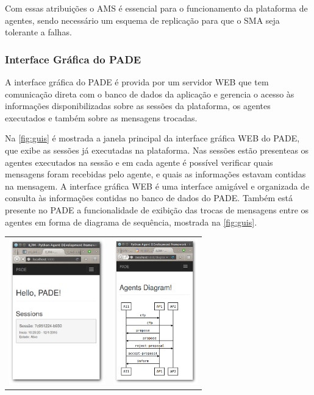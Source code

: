 \documentclass[journal]{IEEEtran}
\begin{document}
Com essas atribuições o AMS é essencial para o funcionamento da plataforma de agentes, sendo necessário um esquema de replicação para que o SMA seja tolerante a falhas.

\subsubsection{Interface Gráfica do PADE}

A interface gráfica do PADE é provida por um servidor WEB que tem comunicação direta com o banco de dados da aplicação e gerencia o acesso às informações disponibilizadas sobre as sessões da plataforma, os agentes executados e também sobre as mensagens trocadas.

Na  \autoref{fig:guis} é mostrada a janela principal da interface gráfica WEB do PADE, que exibe as sessões já executadas na plataforma. Nas sessões estão presenteas os agentes executados na sessão e em cada agente é possível verificar quais mensagens foram recebidas pelo agente, e quais as informações estavam contidas na mensagem. A interface gráfica WEB é uma interface amigável e organizada de consulta às informações contidas no banco de dados do PADE. Também está presente no PADE a funcionalidade de exibição das trocas de mensagens entre os agentes em forma de diagrama de sequência, mostrada na \autoref{fig:guis}.

\begin{table}[htb]
  \centering
  \begin{tabular}{cc}
    \includegraphics[height=2.5in]{Figuras/web_gui.png} & 
    \includegraphics[height=2.5in]{Figuras/troca-de-mensagens.png}\\
  \end{tabular} 
\end{table}
\end{document}
